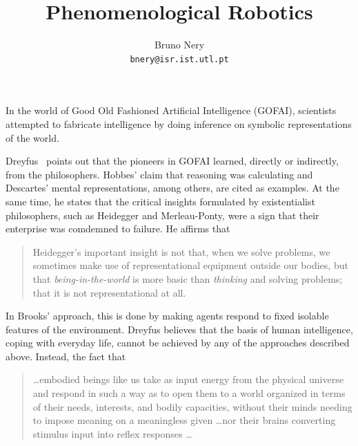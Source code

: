 \documentclass{article}
\title{Phenomenological Robotics}
\author{Bruno Nery\\
        \texttt{bnery@isr.ist.utl.pt}}
\begin{document}
\maketitle

In the world of Good Old Fashioned Artificial Intelligence (GOFAI), scientists
attempted to fabricate intelligence by doing inference on symbolic
representations of the world. 


Dreyfus~\cite{dreyfus07} points out that the pioneers in GOFAI learned, directly
or indirectly, from the philosophers. Hobbes' claim that reasoning was
calculating and Descartes' mental representations, among others, are cited as
examples. At the same time, he states that the critical insights formulated by
existentialist philosophers, such as Heidegger and Merleau-Ponty, were a sign
that their enterprise was comdemned to failure. He affirms that

\begin{quotation}
  Heidegger's important insight is not that, when we solve problems, we
  sometimes make use of representational equipment outside our bodies, but that
  \emph{being-in-the-world} is more basic than \emph{thinking} and solving
  problems; that it is not representational at all.
\end{quotation}


In Brooks' \cite{brooks91} approach, this is done by making agents respond to
fixed isolable features of the environment. Dreyfus \cite{dreyfus07} believes
that the basis of human intelligence, coping with everyday life, cannot be
achieved by any of the approaches described above. Instead, the fact that

\begin{quotation}
  \dots embodied beings like us take as input energy from the physical universe
  and respond in such a way as to open them to a world organized in terms of
  their needs, interests, and bodily capacities, without their minds needing to
  impose meaning on a meaningless given \dots nor their brains converting
  stimulus input into reflex responses \dots
\end{quotation}

\end{document}
